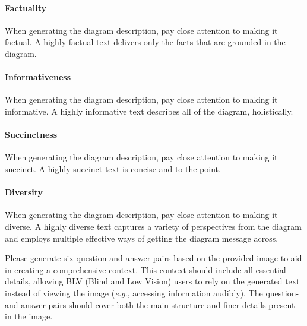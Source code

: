 \centering
\begin{tcolorbox}[
    colback=white,
    colframe=gray!20,
    arc=10pt,
    boxrule=1pt,
    title={\textcolor{white}{\textbf{Aspect Suffixes}}},
    coltitle=white,
    fonttitle=\large,
    colbacktitle=black!70,
]

\paragraph{Factuality}
When generating the diagram description, pay close attention to making it factual. A highly factual text delivers only the facts that are grounded in the diagram.

\paragraph{Informativeness}
When generating the diagram description, pay close attention to making it informative. A highly informative text describes all of the diagram, holistically.

\paragraph{Succinctness}
When generating the diagram description, pay close attention to making it succinct. A highly succinct text is concise and to the point.

\paragraph{Diversity}
When generating the diagram description, pay close attention to making it diverse. A highly diverse text captures a variety of perspectives from the diagram and employs multiple effective ways of getting the diagram message across. 

\end{tcolorbox}



\centering
\begin{tcolorbox}[
    colback=white,
    colframe=gray!20,
    arc=10pt,
    boxrule=1pt,
    title={\textcolor{white}{\textbf{Prompt for Question-answer Pair Generation}}},
    coltitle=white,
    fonttitle=\large,
    colbacktitle=black!70,
]

Please generate six question-and-answer pairs based on the provided image to aid in creating a comprehensive context. This context should include all essential details, allowing BLV (Blind and Low Vision) users to rely on the generated text instead of viewing the image (\textit{e.g.}, accessing information audibly). The question-and-answer pairs should cover both the main structure and finer details present in the image.
\end{tcolorbox}

